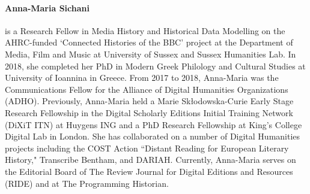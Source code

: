 \paragraph{Anna-Maria Sichani} is a Research Fellow in Media History and Historical Data Modelling on the AHRC-funded ‘Connected Histories of the BBC’ project at the Department of Media, Film and Music at University of Sussex and Sussex Humanities Lab. In 2018, she completed her PhD in Modern Greek Philology and Cultural Studies at University of Ioannina in Greece. From 2017 to 2018, Anna-Maria was the Communications Fellow for the Alliance of Digital Humanities Organizations (ADHO). Previously, Anna-Maria held a Marie Skłodowska-Curie Early Stage Research Fellowship in the Digital Scholarly Editions Initial Training Network (DiXiT ITN) at Huygens ING and a PhD Research Fellowship at King’s College Digital Lab in London. She has collaborated on a number of Digital Humanities projects including the COST Action “Distant Reading for European Literary History," Transcribe Bentham, and DARIAH. Currently, Anna-Maria serves on the Editorial Board of The Review Journal for Digital Editions and Resources (RIDE) and at The Programming Historian.
